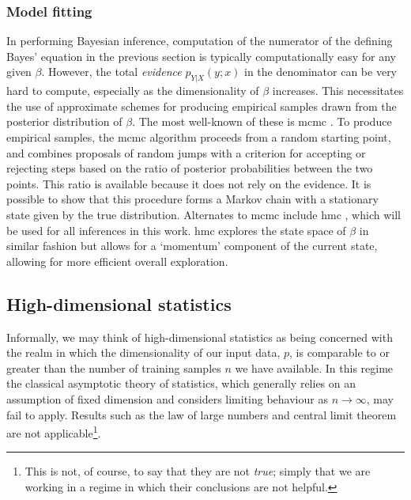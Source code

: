 \documentclass[thesis.tex]{subfiles}
\begin{document}
\subsubsection{Model fitting}
In performing Bayesian inference, computation of the numerator of the defining Bayes' equation in the previous section is typically computationally easy for any given $\beta$. However, the total \emph{evidence} $p_{Y|X}(y;x)$ in the denominator can be very hard to compute, especially as the dimensionality of $\beta$ increases. This necessitates the use of approximate schemes for producing empirical samples drawn from the posterior distribution of $\beta$. The most well-known of these is \gls{mcmc} \citep{hastings_monte_1970, gelfand_sampling-based_1990}. To produce empirical samples, the \gls{mcmc} algorithm proceeds from a random starting point, and combines proposals of random jumps with a criterion for accepting or rejecting steps based on the ratio of posterior probabilities between the two points. This ratio is available because it does not rely on the evidence. It is possible to show that this procedure forms a Markov chain with a stationary state given by the true distribution.
Alternates to \gls{mcmc} include \gls{hmc} \citep{neal_mcmc_2011}, which will be used for all inferences in this work. \gls{hmc} explores the state space of $\beta$ in similar fashion but allows for a `momentum' component of the current state, allowing for more efficient overall exploration.

\subsection{High-dimensional statistics} \label{sec:high_dimensional}

Informally, we may think of high-dimensional statistics as being concerned with the realm in which the dimensionality of our input data, $p$, is comparable to or greater than the number of training samples $n$ we have available. In this regime the classical asymptotic theory of statistics, which generally relies on an assumption of fixed dimension and considers limiting behaviour as $n \rightarrow \infty$, may fail to apply. Results such as the law of large numbers and central limit theorem are not applicable\footnote{This is not, of course, to say that they are not \emph{true}; simply that we are working in a regime in which their conclusions are not helpful.}. 
\end{document}
